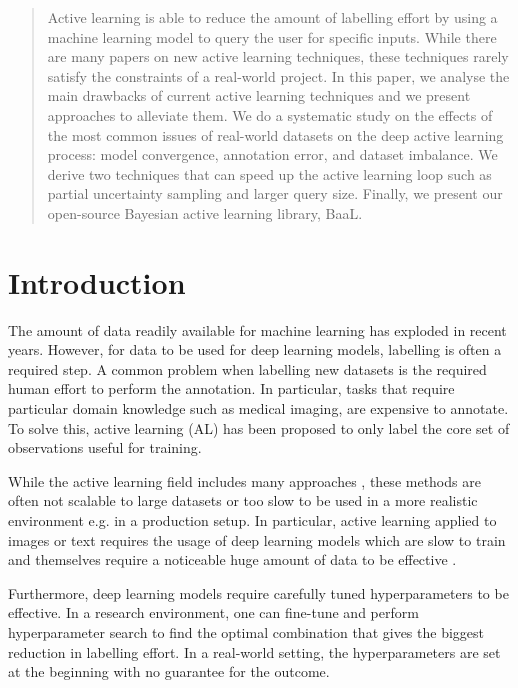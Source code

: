 \documentclass{article}
\begin{document}
\begin{abstract}
\vspace{-0.60cm}
   Active learning is able to reduce the amount of labelling effort by using a machine learning model to query the user for specific inputs.
   While there are many papers on new active learning techniques, these techniques rarely satisfy the constraints of a real-world project. In this paper, we analyse the main drawbacks of current active learning techniques and we present approaches to alleviate them. We do a systematic study on the effects of the most common issues of real-world datasets on the deep active learning process: model convergence, annotation error, and dataset imbalance. We derive two techniques that can speed up the active learning loop such as partial uncertainty sampling and larger query size. Finally, we present our open-source Bayesian active learning library, BaaL.
\end{abstract}


\section{Introduction}
The amount of data readily available for machine learning has exploded in recent years. 
However, for data to be used for deep learning models, labelling is often a required step. 
A common problem when labelling new datasets is the required human effort to perform the annotation. In particular, tasks that require particular domain knowledge such as medical imaging, are expensive to annotate. To solve this, active learning (AL) has been proposed to only label the core set of observations useful for training.

While the active learning field includes many approaches \citep{kirsch2019batchbald, tsymbalov2019deeper, beluch2018power, maddox2019simple}, these methods are often not scalable to large datasets or too slow to be used in a more realistic environment e.g. in a production setup. In particular, active learning applied to images or text requires the usage of deep learning models which are slow to train and themselves require a noticeable huge amount of data to be effective \citep{imagenet_cvpr09, abu2016youtube}.

Furthermore, deep learning models require carefully tuned hyperparameters to be effective. In a research environment, one can fine-tune and perform hyperparameter search to find the optimal combination that gives the biggest reduction in labelling  effort. In a real-world setting, the hyperparameters are set at the beginning with no guarantee for the outcome.
\end{document}

